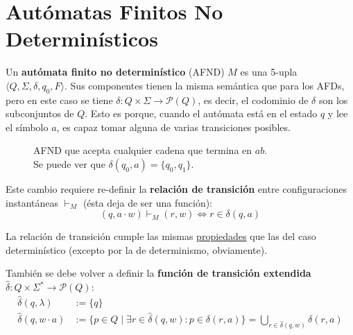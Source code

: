 \section{Autómatas Finitos No Determinísticos}

Un \textbf{autómata finito no determinístico} (AFND) $M$ es una 5-upla $\langle Q, \Sigma, \delta, q_0, F \rangle$. Sus componentes tienen la misma semántica que para los AFDs, pero en este caso se tiene $\delta : Q \times \Sigma \to \mathcal P (Q)$, es decir, el codominio de $\delta$ son los subconjuntos de $Q$. Esto es porque, cuando el autómata está en el estado $q$ y lee el símbolo $a$, es capaz tomar alguna de varias transiciones posibles.

\begin{figure}[H]
    \centering
    \caption*{AFND que acepta cualquier cadena que termina en $ab$. \\ Se puede ver que $\delta(q_0, a) = \{q_0, q_1\}$.}
\end{figure}

Este cambio requiere re-definir la \textbf{relación de transición} entre configuraciones instantáneas $\vdash_M$ (ésta deja de ser una función):
$$
    (q, a \cdot w) \vdash_M (r, w) \iff r \in \delta(q, a)
$$

La relación de transición cumple las mismas \hyperref[subsubsec-propiedades-rel-transicion]{propiedades} que las del caso determinístico (excepto por la de determinismo, obviamente).

También se debe volver a definir la \textbf{función de transición extendida} $\hat \delta : Q \times \Sigma^* \to \mathcal P (Q)$:
$$
    \begin{aligned}
        \hat \delta(q, \lambda)   & := \{q\}                                                                                                                    \\
        \hat \delta(q, w \cdot a) & := \{p \in Q \mid \exists r \in \hat \delta (q, w) : p \in \delta (r, a)\} = \bigcup_{r \in \hat \delta(q, w)} \delta(r, a)
    \end{aligned}
$$

